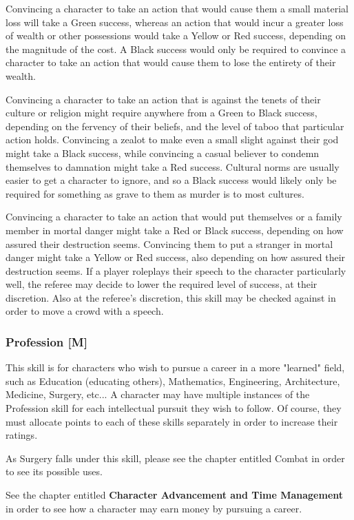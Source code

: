 \documentclass[oneside]{book}
\begin{document}
\begin{multicols}{2}
Convincing a character to take an action that would cause them a small material loss will take a Green success, whereas an action that would incur a greater loss of wealth or other possessions would take a Yellow or Red success, depending on the magnitude of the cost. A Black success would only be required to convince a character to take an action that would cause them to lose the entirety of their wealth. 

Convincing a character to take an action that is against the tenets of their culture or religion might require anywhere from a Green to Black success, depending on the fervency of their beliefs, and the level of taboo that particular action holds. Convincing a zealot to make even a small slight against their god might take a Black success, while convincing a casual believer to condemn themselves to damnation might take a Red success. Cultural norms are usually easier to get a character to ignore, and so a Black success would likely only be required for something as grave to them as murder is to most cultures.

Convincing a character to take an action that would put themselves or a family member in mortal danger might take a Red or Black success, depending on how assured their destruction seems. Convincing them to put a stranger in mortal danger might take a Yellow or Red success, also depending on how assured their destruction seems. 
If a player roleplays their speech to the character particularly well, the referee may decide to lower the required level of success, at their discretion. Also at the referee's discretion, this skill may be checked against in order to move a crowd with a speech.

\subsubsection{Profession [M]}
This skill is for characters who wish to pursue a career in a more "learned" field, such as Education (educating others), Mathematics, Engineering, Architecture, Medicine, Surgery, etc... A character may have multiple instances of the Profession skill for each intellectual pursuit they wish to follow. Of course, they must allocate points to each of these skills separately in order to increase their ratings. 

As Surgery falls under this skill, please see the chapter entitled Combat in order to see its possible uses. 

See the chapter entitled \textbf{Character Advancement and Time Management} in order to see how a character may earn money by pursuing a career. 


\end{multicols}
\end{document}
